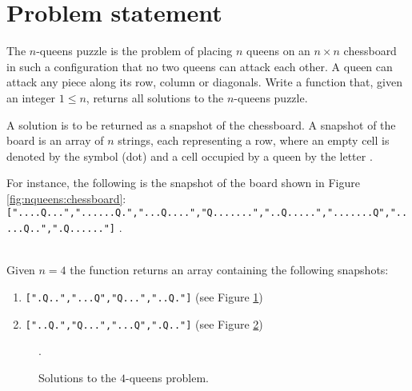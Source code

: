 \section{Problem statement}
\begin{exercise}
\label{example:nqueens:exercice1}
The $n$-queens puzzle is the problem of placing $n$ queens on an $n \times n$ chessboard in such a
configuration that no two queens can attack each other. A queen can attack any piece along its row, column or
diagonals. Write a function that,  given an integer $1 \leq n$, returns all solutions to the
$n$-queens puzzle.

A solution is to be returned as a snapshot of the chessboard. A snapshot of the board is an array of
$n$ strings, each representing a row, where an empty cell is denoted by the symbol  (dot) and a cell
occupied by a queen by the letter .

For instance, the following is the snapshot of the board shown in Figure
\ref{fig:nqueens:chessboard}: \\ \texttt{["....Q...","......Q.","...Q....","Q.......","..Q.....",".......Q",\linebreak".....Q..",".Q......"]} . 

	\begin{example}
		\label{example:nqueens:example1}
		\hfill \\
		Given $n=4$ the function returns an array containing the following snapshots:
		\begin{enumerate}
			\item \texttt{[".Q..","...Q","Q...","..Q."]} (see Figure
			\ref{fig:nqueens:chessboard4x4_1})
			\item \texttt{["..Q.","Q...","...Q",".Q.."]} (see Figure
			\ref{fig:nqueens:chessboard4x4_2})
		\end{enumerate}
		
	\end{example}

\end{exercise}

\begin{figure}[t]
	\centering
	\begin{subfigure}[t]{0.48\textwidth}
		\centering
		\def\myfen{1q2/3q/q3/2q1 w - - 0 1} \chessboard[labelbottomformat=\arabic{filelabel},
					maxfield=d4, %
					showmover=false, %
					setfen=\myfen]
		\caption{}
		 \label{fig:nqueens:chessboard4x4_1}
	 \end{subfigure}
	\hfill
	\begin{subfigure}[t]{0.48\textwidth}
		\centering
		\def\myfen{2q1/q3/3q/1q2 w - - 0 1} \chessboard[labelbottomformat=\arabic{filelabel},
					maxfield=d4, %
					showmover=false, %
					setfen=\myfen]
		\caption{}
		 \label{fig:nqueens:chessboard4x4_2}
	 \end{subfigure}

	\caption{Solutions to the $4$-queens problem.}.
	 \label{fig:nqueens:chessboard4x4}
\end{figure}


